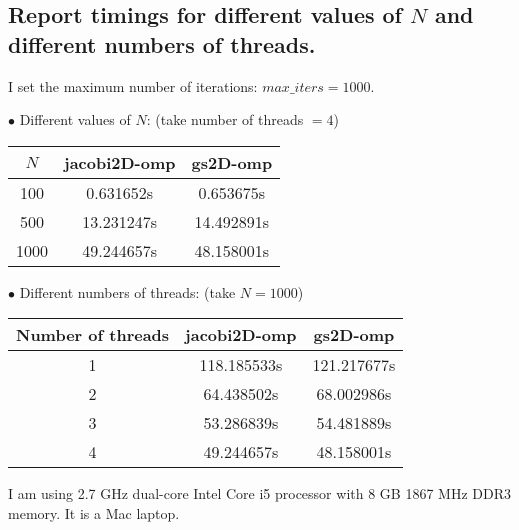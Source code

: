 \documentclass[12pt]{article}
\begin{document}
\begin{enumerate}
\section{Report timings for different values of $N$ and different numbers of threads.}

I set the maximum number of iterations: $max\_iters=1000$.

$\bullet$ Different values of $N$: (take number of threads $=4$)

\begin{table}[ht]
\centering
\begin{tabular}{c|c|c} 
$N$ & jacobi2D-omp & gs2D-omp \\[2 pt] \hline
100 & 0.631652s & 0.653675s \\[2 pt]
500 & 13.231247s & 14.492891s \\[2 pt]
1000 & 49.244657s & 48.158001s \\[2 pt]
\end{tabular}
\end{table}


\vspace{6pt}
$\bullet$ Different numbers of threads: (take $N=1000$)


\begin{table}[ht]
\centering
\begin{tabular}{c|c|c} 
Number of threads & jacobi2D-omp & gs2D-omp \\[2 pt] \hline
1 & 118.185533s & 121.217677s \\[2 pt]
2 & 64.438502s & 68.002986s \\[2 pt]
3 & 53.286839s & 54.481889s \\[2 pt]
4 & 49.244657s & 48.158001s \\[2 pt]
\end{tabular}
\end{table}


I am using 2.7 GHz dual-core Intel Core i5 processor
 with 8 GB 1867 MHz DDR3 memory. It is a Mac laptop.
\end{enumerate}
\end{document}
